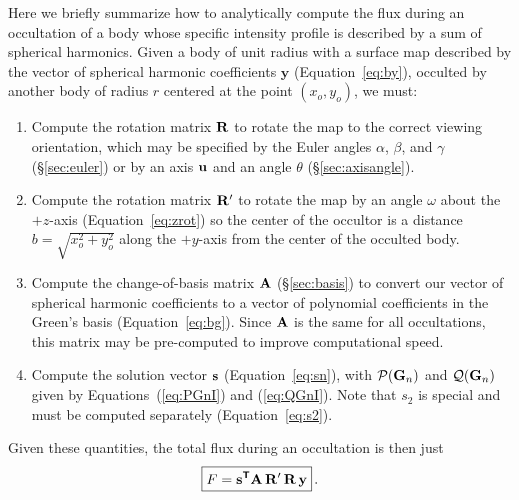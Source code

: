 \documentclass[modern]{aastex61}
\begin{document}
Here we briefly summarize how to analytically compute the flux during
an occultation of a body whose specific intensity profile is described
by a sum of spherical harmonics. Given a body of unit radius with a
surface map described by the vector of spherical harmonic coefficients
$\mathbf{y}$ (Equation~\ref{eq:by}), occulted by another body of radius $r$
centered at the point $(x_o, y_o)$, we must:
%
\begin{enumerate}
    \item Compute the rotation matrix ${\mathbf{R}}$ to rotate the map to the correct
          viewing orientation, which may be
          specified by the Euler angles $\alpha$, $\beta$, and $\gamma$
          (\S\ref{sec:euler}) or by an axis ${\mathbf{u}}$ and an angle $\theta$
          (\S\ref{sec:axisangle}).
    \item Compute the rotation matrix ${\mathbf{R'}}$ to rotate the map
          by an angle $\omega$ about the $+z$-axis
          (Equation~\ref{eq:zrot}) so the center of the occultor is a
          distance $b = \sqrt{x_o^2 + y_o^2}$ along the $+y$-axis
          from the center of the occulted body.
    \item Compute the change-of-basis matrix ${\mathbf{A}}$ (\S\ref{sec:basis}) to
          convert our vector of spherical harmonic coefficients to a vector
          of polynomial coefficients in the Green's basis
          (Equation~\ref{eq:bg}). Since ${\mathbf{A}}$ is the same for all
          occultations, this matrix may be pre-computed to improve
          computational speed.
    \item Compute the solution vector ${\mathbf{s}}$ (Equation~\ref{eq:sn}), with
          $\mathcal{P}({\mathbf{G}}_n)$ and $\mathcal{Q}({\mathbf{G}}_n)$ given by
          Equations~(\ref{eq:PGnI}) and (\ref{eq:QGnI}). Note that $s_2$
          is special and must be computed separately (Equation~\ref{eq:s2}).
\end{enumerate}
%
Given these quantities, the total flux during an occultation is then just
%
\begin{equation}
    \label{eq:starry}
    \boxed{
        F = \bvec{s}^{\boldsymbol{\mathsf{T}}} \bvec{A} \, \bvec{R'} \, \bvec{R} \, \bvec{y}
        }
    \quad.
\end{equation}   %


\end{document}
